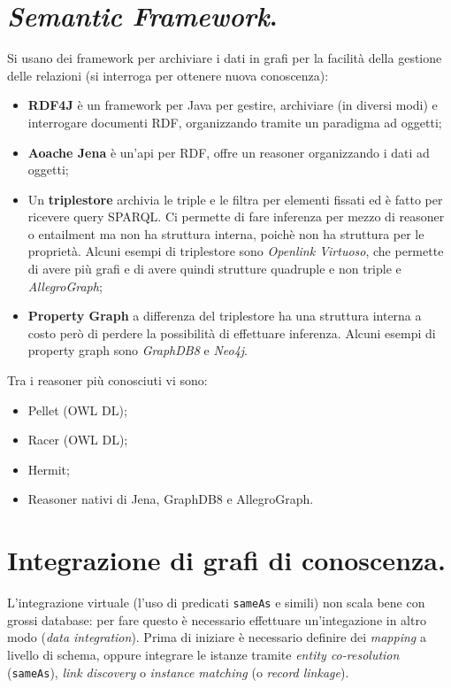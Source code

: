 \documentclass[11pt]{article}
\begin{document}
\section{\textit{Semantic Framework}.}
Si usano dei framework per archiviare i dati in grafi per la facilità della gestione delle relazioni (si interroga per ottenere nuova conoscenza):
\begin{itemize}
\item \textbf{RDF4J} è un framework per Java per gestire, archiviare (in diversi modi) e interrogare documenti RDF, organizzando tramite un paradigma ad oggetti;
\item \textbf{Aoache Jena} è un'api per RDF, offre un reasoner organizzando i dati ad oggetti;
\item Un \textbf{triplestore} archivia le triple e le filtra per elementi fissati ed è fatto per ricevere query SPARQL. Ci permette di fare inferenza per mezzo di reasoner o entailment ma non ha struttura interna, poichè non ha struttura per le proprietà. Alcuni esempi di triplestore sono \textit{Openlink Virtuoso}, che permette di avere più grafi e di avere quindi strutture quadruple e non triple e \textit{AllegroGraph};
\item \textbf{Property Graph} a differenza del triplestore ha una struttura interna a costo però di perdere la possibilità di effettuare inferenza. Alcuni esempi di property graph sono \textit{GraphDB8} e \textit{Neo4j}.
\end{itemize}
Tra i reasoner più conosciuti vi sono:
\begin{itemize}
\item Pellet (OWL DL);
\item Racer (OWL DL);
\item Hermit;
\item Reasoner nativi di Jena, GraphDB8 e AllegroGraph.
\end{itemize}

\section{Integrazione di grafi di conoscenza.}
L'integrazione virtuale (l'uso di predicati \verb|sameAs| e simili) non scala bene con grossi database: per fare questo è necessario effettuare un'integazione in altro modo (\textit{data integration}).
Prima di iniziare è necessario definire dei \textit{mapping} a livello di schema, oppure integrare le istanze tramite \textit{entity co-resolution} (\verb|sameAs|), \textit{link discovery} o \textit{instance matching} (o \textit{record linkage}).
\end{document}
